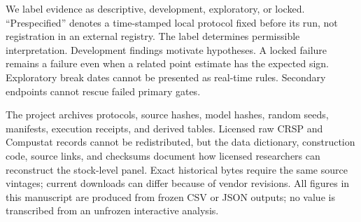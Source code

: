 We label evidence as descriptive, development, exploratory, or locked. ``Prespecified'' denotes a time-stamped local protocol fixed before its run, not registration in an external registry. The label determines permissible interpretation. Development findings motivate hypotheses. A locked failure remains a failure even when a related point estimate has the expected sign. Exploratory break dates cannot be presented as real-time rules. Secondary endpoints cannot rescue failed primary gates.

The project archives protocols, source hashes, model hashes, random seeds, manifests, execution receipts, and derived tables. Licensed raw CRSP and Compustat records cannot be redistributed, but the data dictionary, construction code, source links, and checksums document how licensed researchers can reconstruct the stock-level panel. Exact historical bytes require the same source vintages; current downloads can differ because of vendor revisions. All figures in this manuscript are produced from frozen CSV or JSON outputs; no value is transcribed from an unfrozen interactive analysis.
